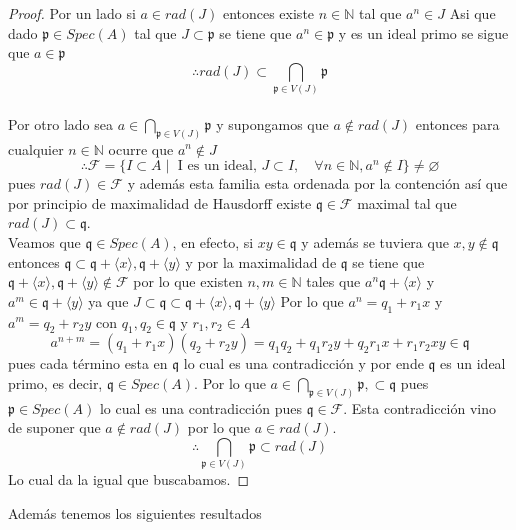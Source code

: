 \documentclass{article}
\begin{document}
\begin{proof}
    Por un lado si $a \in rad(J)$ entonces existe $n\in \mathbb{N}$
    tal que $a^n \in J$ Asi que dado $\mathfrak{p}\in Spec(A)$ tal que
    $J \subset \mathfrak{p}$ se tiene que $a^n \in \mathfrak{p}$ y 
    es un ideal primo se sigue que $a \in \mathfrak{p}$
    $$\therefore rad(J)\subset \bigcap_{\mathfrak{p} \in V(J)} \mathfrak{p}$$
    \\
    Por otro lado sea $a\in \bigcap_{\mathfrak{p} \in V(J)} \mathfrak{p}$ y
    supongamos que $a \notin rad(J)$ entonces para cualquier $n \in \mathbb{N}$
    ocurre que $a^n \notin J$ 
    $$\therefore \mathcal{F} = \{I\subset A \mid 
    \mbox{ I es un ideal, } J\subset I, \quad 
    \forall n\in \mathbb{N}, a^n \notin I\} \neq \varnothing$$
    pues $rad(J) \in \mathcal{F}$ y además esta familia 
    esta ordenada por la contención así que por principio 
    de maximalidad de Hausdorff existe $\mathfrak{q} \in \mathcal{F}$
    maximal tal que $rad(J) \subset \mathfrak{q}$.\\
    Veamos que $\mathfrak{q} \in Spec(A)$, en efecto,
    si $xy \in \mathfrak{q}$ y además se tuviera que $x,y\notin\mathfrak{q}$
    entonces $\mathfrak{q}\subset \mathfrak{q}+ \langle x \rangle, \mathfrak{q}+ \langle y \rangle$
    y por la maximalidad de $\mathfrak{q}$ se tiene que 
    $\mathfrak{q}+ \langle x \rangle, \mathfrak{q}+ \langle y \rangle \notin \mathcal{F}$
    por lo que existen $n, m \in \mathbb{N}$ tales que 
    $a^n \mathfrak{q}+ \langle x \rangle$ y $a^m \in\mathfrak{q}+ \langle y \rangle$
    ya que $J \subset \mathfrak{q} \subset \mathfrak{q}+ \langle x \rangle, \mathfrak{q}+ \langle y \rangle$
    Por lo que $a^n = q_1 + r_1x$ y $a^m = q_2 + r_2 y$ con $q_1, q_2 \in \mathfrak{q}$
    y $r_1, r_2 \in A$
    $$a^{n+m} = (q_1+r_1x)(q_2+r_2y) = q_1q_2 + q_1r_2y + q_2r_1x + r_1r_2xy \in \mathfrak{q}$$
    pues cada término esta en $\mathfrak{q}$
    lo cual es una contradicción y por ende $\mathfrak{q}$ es un ideal 
    primo, es decir, $\mathfrak{q} \in Spec(A)$.
    Por lo que $a \in \bigcap_{\mathfrak{p} \in V(J)} \mathfrak{p},
    \subset \mathfrak{q}$  pues $\mathfrak{p} \in Spec(A)$
    lo cual es una contradicción pues $\mathfrak{q}\in \mathcal{F}$.
    Esta contradicción vino de suponer que $a\notin rad(J)$ por lo que 
    $a \in rad(J)$.
    $$\therefore \bigcap_{\mathfrak{p} \in V(J)} \mathfrak{p} \subset rad(J)$$
    Lo cual da la igual que buscabamos.
\end{proof}

Además tenemos los siguientes resultados
\end{document}
